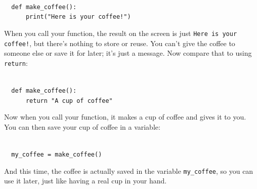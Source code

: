 \texttt{\\
\ \ def make\_coffee():\\
\ \ \ \ \ \ print("Here is your coffee!")\\
}

When you call your function, the result on the screen is just \texttt{Here is your coffee!}, but there's nothing to store or reuse. You can't give the coffee to someone else or save it for later; it's just a message. Now compare that to using \texttt{return}:

\hspace*{2em} \texttt{\\
\ \ def make\_coffee():\\
\ \ \ \ \ \ return "A cup of coffee"\\
}

Now when you call your function, it makes a cup of coffee and gives it to you. You can then save your cup of coffee in a variable:

\texttt{\\
\ \ my\_coffee = make\_coffee()\\
}

And this time, the coffee is actually saved in the variable \texttt{my\_coffee}, so you can use it later, just like having a real cup in your hand.
